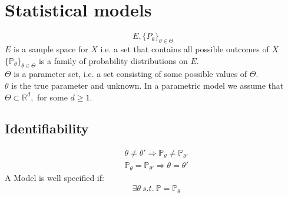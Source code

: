 \section{Statistical models}
\[E, \{ P_\theta \} _{\theta \in \Theta }\]
$E$ is a sample space for $X$ i.e. a set that contains all possible outcomes of $X$\\
$\displaystyle \{ \mathbb {P_\theta }\} _{\theta \in \Theta }$ is a family of probability distributions on $E$.\\
$\Theta$ is a parameter set, i.e. a set consisting of some possible values of $\Theta$.\\
$\theta$ is the true parameter and unknown. In a parametric model we assume that $\Theta \subset \mathbb{R}^d,$ for some $d \geq 1$.
\subsection{Identifiability}
\begin{align*}
&\theta \neq \theta' \Rightarrow \mathbb{P}_{\theta} \neq \mathbb{P}_{\theta'}\\
&\mathbb{P}_{\theta} = \mathbb{P}_{\theta'} \Rightarrow \theta = \theta'
\end{align*}
A Model is well specified if:
\begin{align*}
&\exists \theta \ s.t.\ \mathbb{P} =\mathbb{P}_{\theta }
\end{align*}